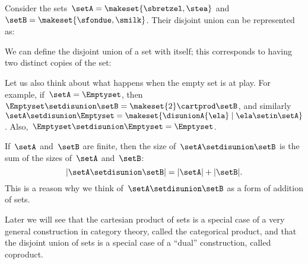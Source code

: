 

Consider the sets~$\setA=\makeset{\sbretzel, \stea}$ and~$\setB=\makeset{\sfondue, \smilk}$.
Their disjoint union can be represented as:

We can define the disjoint union of a set with itself; this corresponds to having two distinct copies of the set:


Let us also think about what happens when the empty set is at play.
For example, if~$\setA = \Emptyset$, then~$\Emptyset \setdisunion \setB =  \makeset{2} \cartprod \setB$, and similarly~$\setA \setdisunion \Emptyset =  \makeset{ \disunionA{\ela} \mid \ela \setin\setA }$.
Also,~$\Emptyset \setdisunion \Emptyset = \Emptyset$.

\begin{remark}
    If~$\setA$ and~$\setB$ are finite, then the size of~$\setA \setdisunion \setB$ is the sum of the sizes of~$\setA$ and~$\setB$:
    \begin{equation}
        \vert \setA \setdisunion \setB \vert = \vert \setA \vert + \vert \setB \vert.
    \end{equation}
    This is a reason why we think of~$\setA \setdisunion \setB$ as a form of addition of sets.
\end{remark}

\begin{remark}
    Later we will see that the cartesian product of sets is a special case of a very general construction in category theory, called the categorical product, and that the disjoint union of sets is a special case of a ``dual'' construction, called coproduct.
\end{remark}
